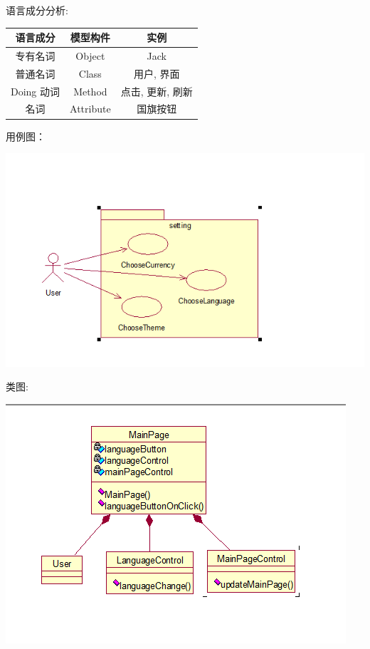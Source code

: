 \documentclass[11pt]{article}
\begin{document}
			语言成分分析: \\
			\begin{center}
			\begin{tabular}{|c|c|c|}
			\hline
			语言成分 & 模型构件 & 实例\\ \hline
			专有名词 & Object & Jack  \\ \hline
			普通名词 & Class & 用户, 界面 \\ \hline
			Doing 动词 & Method &  点击, 更新, 刷新 \\ \hline
			名词 & Attribute & 国旗按钮 \\ \hline
			\end{tabular}
			\end{center}

			用例图：
			\begin{center}
			\includegraphics[scale=0.42]{setting部分用例图.png}
			\end{center}
			
			类图: 
			\begin{center}
			\includegraphics[scale=0.42]{选择语言类图.png}
			\end{center}
\end{document}
